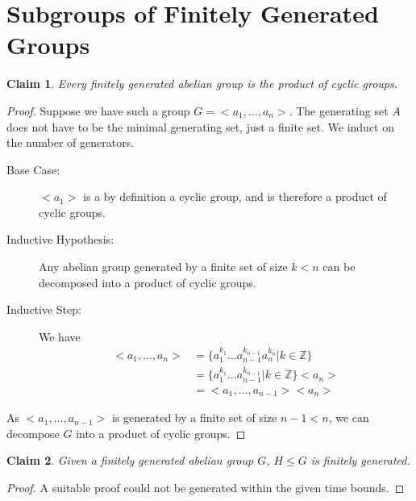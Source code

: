 \documentclass[12pt]{article}
\newtheorem*{claim*}{Claim}
\begin{document}
\section{Subgroups of Finitely Generated Groups}
\begin{claim*}
Every finitely generated abelian group is the product of cyclic groups.
\end{claim*}
\begin{proof}
Suppose we have such a group $G = <a_1, \ldots, a_n>$. The generating set $A$ does not have to be the minimal generating set, just a finite set. We induct on the number of generators.
\begin{description}
\item[Base Case:] $<a_1>$ is a by definition a cyclic group, and is therefore a product of cyclic groups.
\item[Inductive Hypothesis:] Any abelian group generated by a finite set of size $k < n$ can be decomposed into a product of cyclic groups.
\item[Inductive Step:] We have
\begin{align*}
<a_1, \ldots, a_n> &= \{a_1^{k_1} \ldots a_{n - 1}^{k_{n - 1}} a_n^{k_n} | k \in \mathbb{Z}\}\\
                    &= \{a_1^{k_1} \ldots a_{n - 1}^{k_{n - 1}} | k \in \mathbb{Z}\}<a_n>\\
                    &= <a_1, \ldots, a_{n - 1}><a_n>
\end{align*}
\end{description}
As $<a_1, \ldots, a_{n - 1}>$ is generated by a finite set of size $n - 1 < n$, we can decompose $G$ into a product of cyclic groups.
\end{proof}
\begin{claim*}
Given a finitely generated abelian group $G$, $H \leq G$ is finitely generated.
\end{claim*}
\begin{proof}
A suitable proof could not be generated within the given time bounds.
\end{proof}
\end{document}
